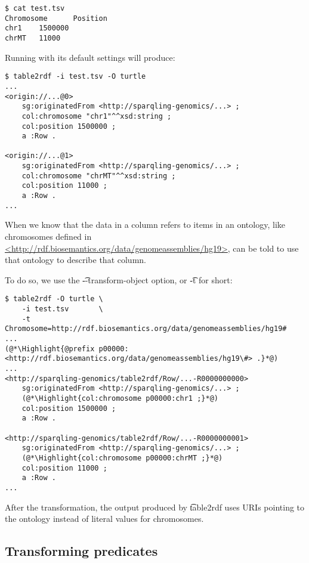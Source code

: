 \begin{lstlisting}
$ cat test.tsv
Chromosome      Position
chr1    1500000
chrMT   11000
\end{lstlisting}

  Running  with its default settings will produce:

\begin{lstlisting}
$ table2rdf -i test.tsv -O turtle
...
<origin://...@0>
    sg:originatedFrom <http://sparqling-genomics/...> ;
    col:chromosome "chr1"^^xsd:string ;
    col:position 1500000 ;
    a :Row .

<origin://...@1>
    sg:originatedFrom <http://sparqling-genomics/...> ;
    col:chromosome "chrMT"^^xsd:string ;
    col:position 11000 ;
    a :Row .
...
\end{lstlisting}

  \begin{sloppypar}
  When we know that the data in a column refers to items in an ontology, like
  chromosomes defined in
  \href{http://rdf.biosemantics.org/data/genomeassemblies/hg19}%
  {<http://rdf.biosemantics.org/data/genomeassemblies/hg19>}, 
  can be told to use that ontology to describe that column.
  \end{sloppypar}

  To do so, we use the \t{-{}-transform-object} option, or \t{-t}
  for short:

\begin{lstlisting}
$ table2rdf -O turtle \
    -i test.tsv       \
    -t Chromosome=http://rdf.biosemantics.org/data/genomeassemblies/hg19#
...
(@*\Highlight{@prefix p00000: <http://rdf.biosemantics.org/data/genomeassemblies/hg19\#> .}*@)
...
<http://sparqling-genomics/table2rdf/Row/...-R0000000000>
    sg:originatedFrom <http://sparqling-genomics/...> ;
    (@*\Highlight{col:chromosome p00000:chr1 ;}*@)
    col:position 1500000 ;
    a :Row .

<http://sparqling-genomics/table2rdf/Row/...-R0000000001>
    sg:originatedFrom <http://sparqling-genomics/...> ;
    (@*\Highlight{col:chromosome p00000:chrMT ;}*@)
    col:position 11000 ;
    a :Row .
...
\end{lstlisting}

  After the transformation, the output produced by \t{table2rdf} uses
  URIs pointing to the ontology instead of literal values for chromosomes.

\subsection{Transforming predicates}

